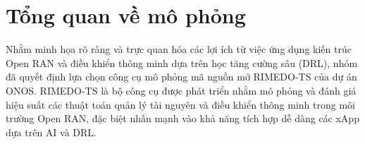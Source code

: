 \section{Tổng quan về mô phỏng}

Nhằm minh họa rõ ràng và trực quan hóa các lợi ích từ việc ứng dụng kiến trúc Open RAN và điều khiển thông minh dựa trên học tăng cường sâu (DRL), nhóm đã quyết định lựa chọn công cụ mô phỏng mã nguồn mở RIMEDO-TS của dự án ONOS. RIMEDO-TS là bộ công cụ được phát triển nhằm mô phỏng và đánh giá hiệu suất các thuật toán quản lý tài nguyên và điều khiển thông minh trong môi trường Open RAN, đặc biệt nhấn mạnh vào khả năng tích hợp dễ dàng các xApp dựa trên AI và DRL.

